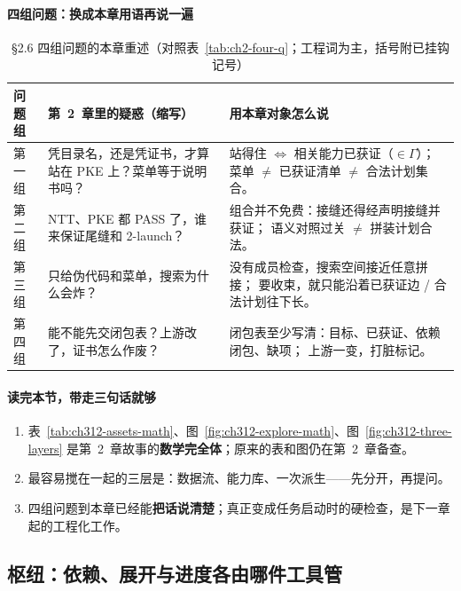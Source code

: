 \documentclass[UTF8,a4paper,11pt]{ctexart}
\theoremstyle{definition}
\theoremstyle{plain}
\theoremstyle{remark}
\numberwithin{figure}{section}
\numberwithin{table}{section}
\begin{document}
\paragraph{四组问题：换成本章用语再说一遍}
\begin{table}[H]
\centering\small
\caption{§2.6 四组问题的本章重述（对照表~\ref{tab:ch2-four-q}；工程词为主，括号附已挂钩记号）}
\label{tab:ch312-four-q}
\begin{tabular}{@{}L{1.6cm}L{6.0cm}L{6.2cm}@{}}
  \toprule
  问题组 & 第~2~章里的疑惑（缩写） & 用本章对象怎么说 \\
  \midrule
  第一组 &
  凭目录名，还是凭证书，才算站在 PKE 上？菜单等于说明书吗？ &
  站得住 $\Leftrightarrow$ 相关能力已获证（$\in\Gamma$）；
  菜单 $\neq$ 已获证清单 $\neq$ 合法计划集合。 \\
  \midrule
  第二组 &
  NTT、PKE 都 PASS 了，谁来保证尾缝和 2-launch？ &
  组合并不免费：接缝还得经声明接缝并获证；
  语义对照过关 $\neq$ 拼装计划合法。 \\
  \midrule
  第三组 &
  只给伪代码和菜单，搜索为什么会炸？ &
  没有成员检查，搜索空间接近任意拼接；
  要收束，就只能沿着已获证边 / 合法计划往下长。 \\
  \midrule
  第四组 &
  能不能先交闭包表？上游改了，证书怎么作废？ &
  闭包表至少写清：目标、已获证、依赖闭包、缺项；
  上游一变，打脏标记。 \\
  \bottomrule
\end{tabular}
\end{table}

\paragraph{读完本节，带走三句话就够}
\begin{enumerate}
  \item 表~\ref{tab:ch312-assets-math}、图~\ref{fig:ch312-explore-math}、图~\ref{fig:ch312-three-layers}
        是第~2~章故事的\textbf{数学完全体}；原来的表和图仍在第~2~章备查。
  \item 最容易搅在一起的三层是：数据流、能力库、一次派生——先分开，再提问。
  \item 四组问题到本章已经能\textbf{把话说清楚}；真正变成任务启动时的硬检查，是下一章起的工程化工作。
\end{enumerate}

\subsection{枢纽：依赖、展开与进度各由哪件工具管}
\label{sec:three-layers}
\end{document}
